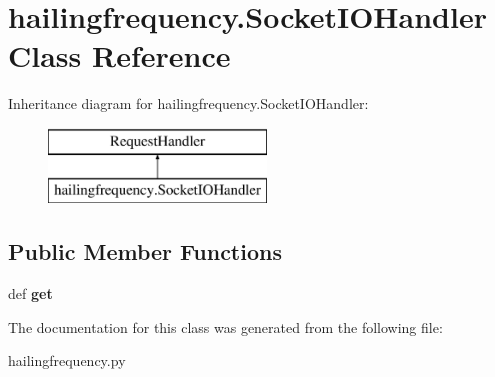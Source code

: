 \hypertarget{classhailingfrequency_1_1_socket_i_o_handler}{\section{hailingfrequency.\-Socket\-I\-O\-Handler Class Reference}
\label{classhailingfrequency_1_1_socket_i_o_handler}
}
Inheritance diagram for hailingfrequency.\-Socket\-I\-O\-Handler\-:\begin{figure}[H]
\begin{center}
\leavevmode
\includegraphics[height=2.000000cm]{classhailingfrequency_1_1_socket_i_o_handler}
\end{center}
\end{figure}
\subsection*{Public Member Functions}
\begin{DoxyCompactItemize}
\item 
\hypertarget{classhailingfrequency_1_1_socket_i_o_handler_a344624a70ebaa23998ce598a0dedbdc7}{def {\bfseries get}}\label{classhailingfrequency_1_1_socket_i_o_handler_a344624a70ebaa23998ce598a0dedbdc7}

\end{DoxyCompactItemize}


The documentation for this class was generated from the following file\-:\begin{DoxyCompactItemize}
\item 
hailingfrequency.\-py\end{DoxyCompactItemize}
